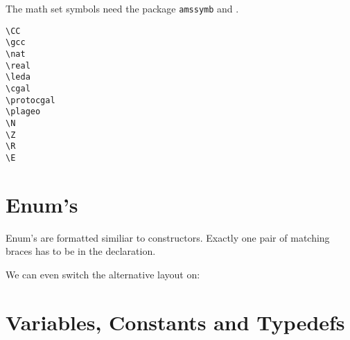 \documentclass[12pt]{article}
\begin{document}
{The math set symbols need the package
{\tt amssymb} and \LaTeXe.

\begin{tabbing}
  \> \verb+\CC+         \> \CC         \\
  \> \verb+\gcc+        \> \gcc        \\
  \> \verb+\nat+        \> \nat        \\
  \> \verb+\real+       \> \real       \\
  \> \verb+\leda+       \> \leda       \\
  \> \verb+\cgal+       \> \cgal       \\
  \> \verb+\protocgal+  \> \protocgal  \\
  \> \verb+\plageo+     \> \plageo     \\ 
  \> \verb+\+\verb+N+        \> \N        \\
  \> \verb+\+\verb+Z+        \> \Z        \\
  \> \verb+\+\verb+R+        \> \R        \\
  \> \verb+\+\verb+E+        \> \E
\end{tabbing}

\section{Enum's}

Enum's are formatted similiar to constructors. Exactly one pair of
matching braces has to be in the declaration.




We can even switch the alternative layout on:

\def\ccLongParamLayout{\ccTrue}


\def\ccLongParamLayout{\ccFalse}


\section{Variables, Constants and Typedefs}

}
\end{document}
